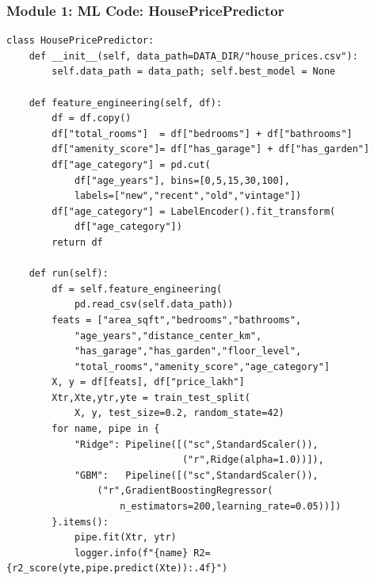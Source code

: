 \begin{frame}[fragile]\frametitle{Module 1: ML Code: HousePricePredictor}
\begin{lstlisting}
class HousePricePredictor:
    def __init__(self, data_path=DATA_DIR/"house_prices.csv"):
        self.data_path = data_path; self.best_model = None

    def feature_engineering(self, df):
        df = df.copy()
        df["total_rooms"]  = df["bedrooms"] + df["bathrooms"]
        df["amenity_score"]= df["has_garage"] + df["has_garden"]
        df["age_category"] = pd.cut(
            df["age_years"], bins=[0,5,15,30,100],
            labels=["new","recent","old","vintage"])
        df["age_category"] = LabelEncoder().fit_transform(
            df["age_category"])
        return df

    def run(self):
        df = self.feature_engineering(
            pd.read_csv(self.data_path))
        feats = ["area_sqft","bedrooms","bathrooms",
            "age_years","distance_center_km",
            "has_garage","has_garden","floor_level",
            "total_rooms","amenity_score","age_category"]
        X, y = df[feats], df["price_lakh"]
        Xtr,Xte,ytr,yte = train_test_split(
            X, y, test_size=0.2, random_state=42)
        for name, pipe in {
            "Ridge": Pipeline([("sc",StandardScaler()),
                               ("r",Ridge(alpha=1.0))]),
            "GBM":   Pipeline([("sc",StandardScaler()),
                ("r",GradientBoostingRegressor(
                    n_estimators=200,learning_rate=0.05))])
        }.items():
            pipe.fit(Xtr, ytr)
            logger.info(f"{name} R2={r2_score(yte,pipe.predict(Xte)):.4f}")
\end{lstlisting}
\end{frame}

